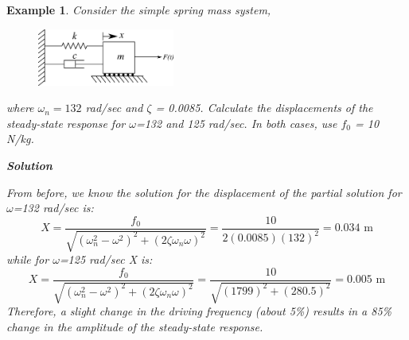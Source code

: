 \documentclass[12pt,letter]{article}
\newtheorem{ex}{Example}
\numberwithin{ex}{section} %
\newenvironment{example}{\begin{mdframed}[middlelinewidth=0.5mm]\begin{ex}\normalfont}{\end{ex}\end{mdframed}}
\begin{document}
\begin{example}

			Consider the simple spring mass system, 
			\begin{figure}[H]
				\centering
				\includegraphics[width=0.4\textwidth]{../Figures/system_1DOF_horiziontal_damped_forced.png}
			\end{figure}				
			where $\omega_n = 132$ rad/sec and $\zeta$ = 0.0085. Calculate the displacements of the steady-state response for $\omega$=132 and 125 rad/sec. In both cases, use $f_0$ = 10 N/kg. 

			\textbf{Solution}
			
			From before, we know the solution for the displacement of the partial solution for $\omega$=132 rad/sec is:
			\begin{equation}
				X = \frac{f_0}{\sqrt{(\omega_n^2 - \omega^2)^2 +  (2\zeta \omega_n \omega)^2}} = \frac{10}{2(0.0085)(132)^2} = 0.034 \text{ m}
			\end{equation}							
			while for $\omega$=125 rad/sec X is:
			\begin{equation}
				X = \frac{f_0}{\sqrt{(\omega_n^2 - \omega^2)^2 +  (2\zeta \omega_n \omega)^2}} = \frac{10}{\sqrt{(1799)^2 +  (280.5)^2}}  = 0.005 \text{ m}
			\end{equation}				
			Therefore, a slight change in the driving frequency (about 5\%) results in a 85\% change in the amplitude of the steady-state response. 
\end{example}
\end{document}
